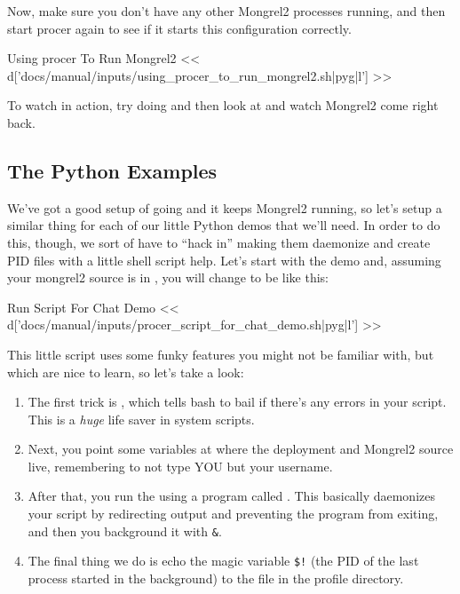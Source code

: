 Now, make sure you don't have any other Mongrel2 processes running,
and then start procer again to see if it starts this configuration
correctly.


\begin{code}{Using procer To Run Mongrel2}
<< d['docs/manual/inputs/using_procer_to_run_mongrel2.sh|pyg|l'] >>
\end{code}

To watch  in action, try doing  and then look at  and watch
Mongrel2 come right back.


\subsection{The Python Examples}

We've got a good setup of  going and it keeps Mongrel2
running, so let's setup a similar thing for each of our little
Python demos that we'll need.  In order to do this, though, we sort
of have to ``hack in'' making them daemonize and create PID files with
a little shell script help.  Let's start with the  demo
and, assuming your mongrel2 source is in ,
you will change  to be like this:

\begin{code}{Run Script For Chat Demo}
<< d['docs/manual/inputs/procer_script_for_chat_demo.sh|pyg|l'] >>
\end{code}

This little script uses some funky features you might not be familiar
with, but which are nice to learn, so let's take a look:


\begin{enumerate}
\item The first trick is , which tells bash to bail if there's
    any errors in your script.  This is a \emph{huge} life saver in system
    scripts.
\item Next, you point some variables at where the deployment and Mongrel2 source
    live, remembering to not type YOU but your username.
\item After that, you run the  using a program called .
    This basically daemonizes your script by redirecting output and
    preventing the program from exiting, and then you background it with \verb|&|.
\item The final thing we do is echo the magic variable \verb|$!| (the PID of the
  last process started in the background) to the  file in the
  profile directory.
\end{enumerate}

